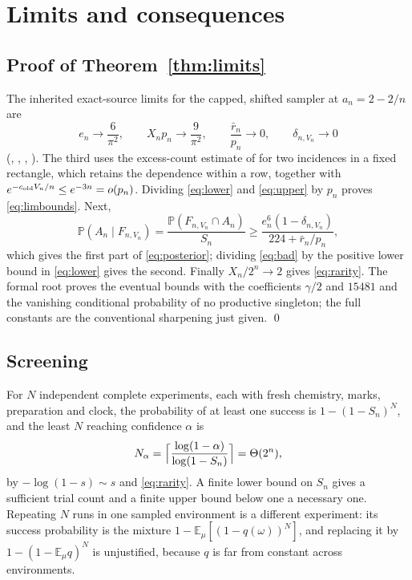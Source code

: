 \documentclass[11pt,letterpaper]{article}
\theoremstyle{plain}
\theoremstyle{definition}
\theoremstyle{remark}
\numberwithin{equation}{section}
\newcommand{\PP}{\mathbb P}
\newcommand{\EE}{\mathbb E}
\begin{document}
\section{Limits and consequences}\label{sec:consequences}

\subsection{Proof of Theorem~\ref{thm:limits}}
The inherited exact-source limits for the capped, shifted sampler at $a_n=2-2/n$ are
\begin{equation}\label{eq:sourcelimits}
 e_n\to\frac6{\pi^2},\qquad X_np_n\to\frac9{\pi^2},\qquad \frac{\bar r_n}{p_n}\to0,\qquad \delta_{n,V_n}\to0
\end{equation}
(, , , ). The third uses the excess-count estimate of \cite{diffuse2026} for two incidences in a fixed rectangle, which retains the dependence within a row, together with $e^{-c_{\rm old}V_n/n}\le e^{-3n}=o(p_n)$. Dividing \eqref{eq:lower} and \eqref{eq:upper} by $p_n$ proves \eqref{eq:limbounds}. Next,
\begin{equation}\label{eq:posteriorfinite}
 \PP(A_n\mid F_{n,V_n})=\frac{\PP(F_{n,V_n}\cap A_n)}{S_n}\ge\frac{e_n^6(1-\delta_{n,V_n})}{224+\bar r_n/p_n},
\end{equation}
which gives the first part of \eqref{eq:posterior}; dividing \eqref{eq:bad} by the positive lower bound in \eqref{eq:lower} gives the second. Finally $X_n/2^n\to2$ gives \eqref{eq:rarity}. The formal root proves the eventual bounds with the coefficients $\gamma/2$ and $15481$ and the vanishing conditional probability of no productive singleton; the full constants are the conventional sharpening just given. \qed

\subsection{Screening}
For $N$ independent complete experiments, each with fresh chemistry, marks, preparation and clock, the probability of at least one success is $1-(1-S_n)^N$, and the least $N$ reaching confidence $\alpha$ is
\begin{equation}\label{eq:screen}
 N_\alpha=\Bigl\lceil\frac{\log(1-\alpha)}{\log(1-S_n)}\Bigr\rceil=\Theta(2^n),
\end{equation}
by $-\log(1-s)\sim s$ and \eqref{eq:rarity}. A finite lower bound on $S_n$ gives a sufficient trial count and a finite upper bound below one a necessary one. Repeating $N$ runs in one sampled environment is a different experiment: its success probability is the mixture $1-\EE_\mu[(1-q(\omega))^N]$, and replacing it by $1-(1-\EE_\mu q)^N$ is unjustified, because $q$ is far from constant across environments.
\end{document}
